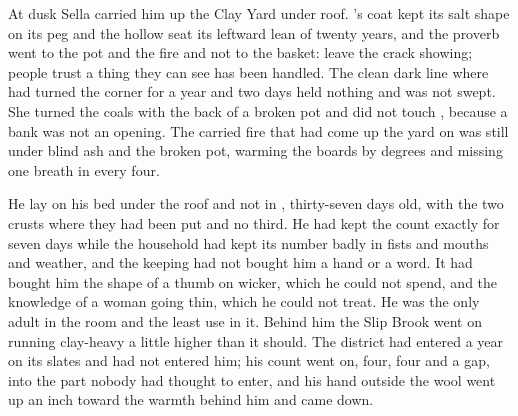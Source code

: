 At dusk Sella carried him up the Clay Yard under  roof. 's coat kept its salt shape on its peg and the hollow seat its leftward lean of twenty years, and the proverb went to the pot and the fire and not to the basket: leave the crack showing; people trust a thing they can see has been handled. The clean dark line where  had turned the corner for a year and two days held nothing and was not swept. She turned the coals with the back of a broken pot and did not touch , because a bank was not an opening. The carried fire that had come up the yard on  was still under blind ash and the broken pot, warming the boards by degrees and missing one breath in every four.

He lay on his bed under the roof and not in , thirty-seven days old, with the two crusts where they had been put and no third. He had kept the count exactly for seven days while the household had kept its number badly in fists and mouths and weather, and the keeping had not bought him a hand or a word. It had bought him the shape of a thumb on wicker, which he could not spend, and the knowledge of a woman going thin, which he could not treat. He was the only adult in the room and the least use in it. Behind him the Slip Brook went on running clay-heavy a little higher than it should. The district had entered a year on its slates and had not entered him; his count went on, four, four and a gap, into the part nobody had thought to enter, and his hand outside the wool went up an inch toward the warmth behind him and came down.
